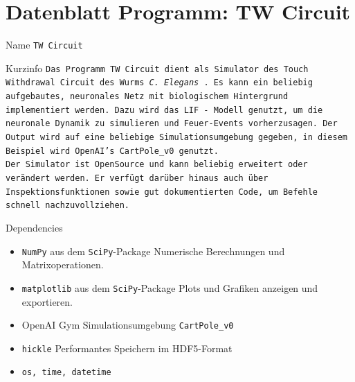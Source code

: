 \chapter{Datenblatt Programm: TW Circuit}
%
\label{app:datenblatt}
\enlargethispage{2\baselineskip}
\begin{minipage}[b]{0.61\textwidth}
	\begin{mybox}{Name}
		\texttt{TW Circuit}
	\end{mybox}
	\begin{mybox}{Kurzinfo}
		\texttt{Das Programm TW Circuit dient als Simulator des Touch Withdrawal Circuit des Wurms \textit{C. Elegans} \cite{WormLevelRL}. Es kann ein beliebig aufgebautes, neuronales Netz mit biologischem Hintergrund implementiert werden. Dazu wird das LIF - Modell genutzt, um die neuronale Dynamik zu simulieren und Feuer-Events vorherzusagen. Der Output wird auf eine beliebige Simulationsumgebung gegeben, in diesem Beispiel wird OpenAI's CartPole\_v0 genutzt.\\ Der Simulator ist OpenSource und kann beliebig erweitert oder verändert werden. Er verfügt darüber hinaus auch über Inspektionsfunktionen sowie gut dokumentierten Code, um Befehle schnell nachzuvollziehen.}
	\end{mybox}
	\begin{mybox}{Dependencies}
		\begin{itemize}
			\item \texttt{NumPy} aus dem \texttt{SciPy}-Package
			\subitem Numerische Berechnungen und Matrixoperationen.
			\item \texttt{matplotlib} aus dem \texttt{SciPy}-Package
			\subitem Plots und Grafiken anzeigen und exportieren.
			\item OpenAI Gym
			\subitem Simulationsumgebung \texttt{CartPole\_v0}
			\item \texttt{hickle}
			\subitem Performantes Speichern im HDF5-Format
			\item \texttt{os, time, datetime}
		\end{itemize}
	\end{mybox}
\end{minipage}
